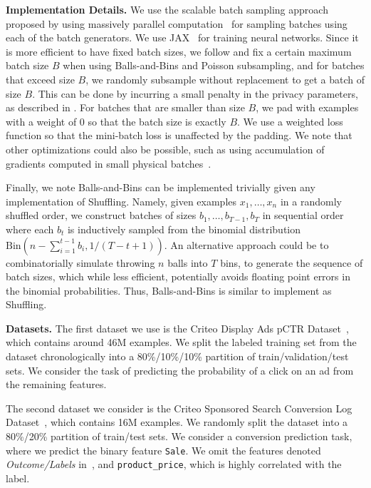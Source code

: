 \documentclass[twoside]{article}
\theoremstyle{definition}
\newcommand{\BnB}{Balls-and-Bins\xspace}
\begin{document}
{\bf Implementation Details.}
We use the scalable batch sampling approach proposed by \cite{chua24scalable} using massively parallel computation~\citep{dean04mapreduce} for sampling batches using each of the batch generators.
We use JAX~\citep{jax2018github} for training neural networks.
Since it is more efficient to have fixed batch sizes, we follow \cite{chua24scalable} and fix a certain maximum batch size $B$ when using \BnB and Poisson subsampling, and for batches that exceed size $B$, we randomly subsample without replacement to get a batch of size $B$. This can be done by incurring a small penalty in the privacy parameters, as described in .
For batches that are smaller than size $B$, we pad with  examples with a weight of $0$ so that the batch size is exactly $B$. We use a weighted loss function so that the mini-batch loss is unaffected by the padding.
We note that other optimizations could also be possible, such as using accumulation of gradients computed in small physical batches~\citep{abadi16deep,beltran24towards}.

Finally, we note \BnB can be implemented trivially given any implementation of Shuffling. Namely, given examples $x_1, \ldots, x_n$ in a randomly shuffled order, we construct batches of sizes $b_1, \ldots, b_{T-1}, b_T$ in sequential order where each $b_t$ is inductively sampled from the binomial distribution $\mathrm{Bin}(n - \sum_{i=1}^{t-1} b_i, 1/(T-t+1))$. An alternative approach could be to combinatorially simulate throwing $n$ balls into $T$ bins, to generate the sequence of batch sizes, which while less efficient, potentially avoids floating point errors in the binomial probabilities. Thus, \BnB is similar to implement as Shuffling.

{\bf Datasets.}
The first dataset we use is the Criteo Display Ads pCTR Dataset~\citep{tien14criteokaggle}, which contains around 46M examples. We split the labeled training set from the dataset chronologically into a 80\%/10\%/10\% partition of train/validation/test sets. We consider the task of predicting the probability of a click on an ad from the remaining features.

The second dataset we consider is the Criteo Sponsored Search Conversion Log Dataset~\citep{tallis2018reacting}, which contains 16M examples. We randomly split the dataset into a 80\%/20\% partition of train/test sets. We consider a conversion prediction task, where we predict the binary feature \texttt{Sale}. We omit the features denoted \textit{Outcome/Labels} in~\cite{tallis2018reacting}, and \texttt{product\_price}, which is highly correlated with the label.
\end{document}
